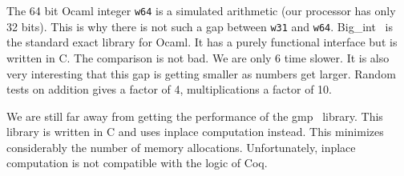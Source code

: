 The 64 bit {\sc Ocaml} integer {\tt w64} is a simulated arithmetic 
(our processor has only 32 bits).
This is why there is not such a gap between {\tt w31} and {\tt w64}. 
{\sc Big\_int}~\cite{bignum} is the  standard exact library for {\sc Ocaml}. 
It has a purely functional interface but 
is written in C. The comparison is not bad. We are only 6 time slower. 
It is also very interesting
that this gap is getting smaller as numbers get larger. 
Random tests on addition gives a factor of
4, multiplications a factor of 10.

We are still far away from getting the performance of the {\sc gmp}~\cite{GMP}
 library. This library is written in C and uses inplace computation instead. 
This minimizes considerably the number of memory allocations.
Unfortunately, inplace computation is not compatible with 
the logic of {\sc Coq}.

